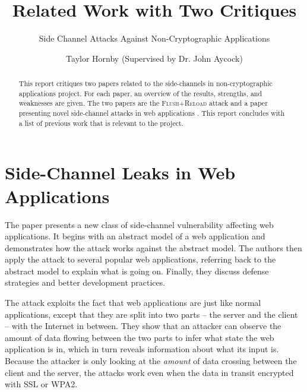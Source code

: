 \documentclass{acm_proc_article-sp}
\begin{document}
\sloppy

\title{Related Work with Two Critiques}
\subtitle{Side Channel Attacks Against Non-Cryptographic Applications}


\author{
\alignauthor
Taylor Hornby (Supervised by Dr. John Aycock)\\
}

\maketitle

\begin{abstract}
This report critiques two papers related to the side-channels in
non-cryptographic applications project. For each paper, an overview of the
results, strengths, and weaknesses are given. The two papers are the
\textsc{Flush+Reload} attack \cite{yarom2013flush} and a paper presenting novel
side-channel attacks in web applications \cite{chen2010side}. This report
concludes with a list of previous work that is relevant to the project.
\end{abstract}

\section{Side-Channel Leaks in Web Applications}

The paper \cite{chen2010side} presents a new class of side-channel vulnerability
affecting web applications. It begins with an abstract model of a web
application and demonstrates how the attack works against the abstract model.
The authors then apply the attack to several popular web applications, referring
back to the abstract model to explain what is going on. Finally, they discuss
defense strategies and better development practices.

The attack exploits the fact that web applications are just like normal
applications, except that they are split into two parts -- the server and the
client -- with the Internet in between. They show that an attacker can observe
the amount of data flowing between the two parts to infer what state the web
application is in, which in turn reveals information about what its input is.
Because the attacker is only looking at the \emph{amount} of data crossing
between the client and the server, the attacks work even when the data in
transit encrypted with SSL or WPA2.
\end{document}
